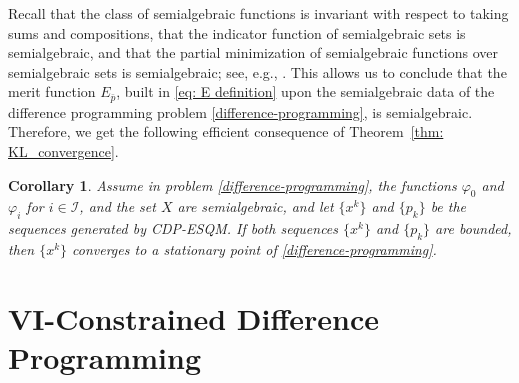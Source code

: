 \documentclass[11pt,a4paper]{article}
\newtheorem{corollary}[theorem]{Corollary}
\theoremstyle{plain}
\begin{document}
Recall that the class of semialgebraic functions is invariant with respect to taking sums and compositions, that the indicator function of semialgebraic sets is semialgebraic, and that the partial minimization of
semialgebraic functions over semialgebraic sets is semialgebraic; see, e.g., \cite{Attouch2013}. This allows us to conclude that the merit function \( E_{\bar{p}} \), built in \eqref{eq: E definition} upon the semialgebraic data of the difference programming problem \eqref{difference-programming}, is semialgebraic. Therefore, we get the following efficient consequence of Theorem~\ref{thm: KL_convergence}.

\begin{corollary}\label{cor:semi} Assume in problem \eqref{difference-programming}, the functions $\varphi_0$ and $\varphi_i$ for $i\in\mathcal{I}$, and the set $X$ are semialgebraic, and let $\{x^k\}$ and $\{p_k\}$  be the sequences generated by CDP-ESQM. 
If both sequences $\{x^k\}$ and $\{p_k\}$ are bounded, then $\{x^k\}$  converges to a stationary point of \eqref{difference-programming}.
\end{corollary}





\section{VI-Constrained Difference Programming}\label{sec:VI-constrained}
\setcounter{equation}{0}
\end{document}
